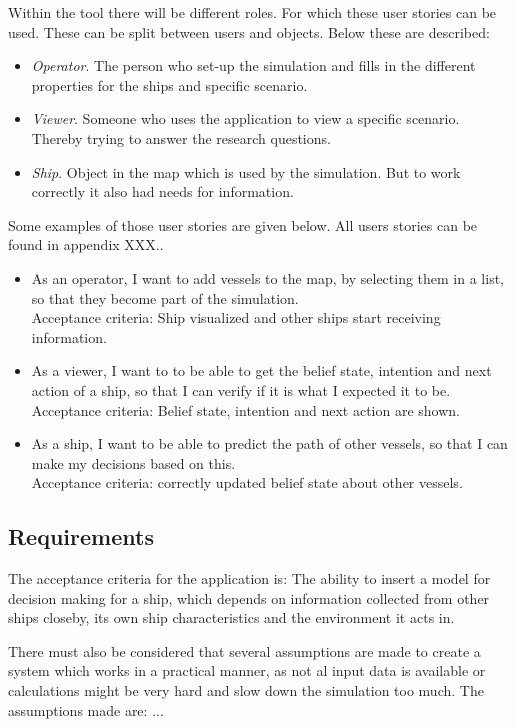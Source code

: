 Within the tool there will be different roles. For which these user stories can be used. These can be split between users and objects. Below these are described:
\begin{itemize}
	\item \emph{Operator}. The person who set-up the simulation and fills in the different properties for the ships and specific scenario.
	\item \emph{Viewer}. Someone who uses the application to view a specific scenario. Thereby trying to answer the research questions.
	\item \emph{Ship}. Object in the map which is used by the simulation. But to work correctly it also had needs for information.
\end{itemize}

Some examples of those user stories are given below. All users stories can be found in appendix XXX.. 
\begin{itemize}
	\item As an operator, I want to add vessels to the map, by selecting them in a list, so that they become part of the simulation. \\
	Acceptance criteria: Ship visualized and other ships start receiving information.
	\item As a viewer, I want to to be able to get the belief state, intention and next action of a ship, so that I can verify if it is what I expected it to be. \\
	Acceptance criteria: Belief state, intention and next action are shown.
	\item As a ship, I want to be able to predict the path of other vessels, so that I can make my decisions based on this. \\
	Acceptance criteria: correctly updated belief state about other vessels.
\end{itemize}

\subsection{Requirements}
The acceptance criteria for the application is: The ability to insert a model for decision making for a ship, which depends on information collected from other ships closeby, its own ship characteristics and the environment it acts in.

There must also be considered that several assumptions are made to create a system which works in a practical manner, as not al input data is available or calculations might be very hard and slow down the simulation too much. The assumptions made are: ...

